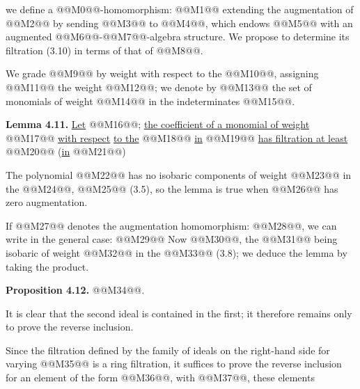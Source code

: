 we define a @@M0@@-homomorphism: @@M1@@ extending the augmentation of @@M2@@ by sending @@M3@@ to @@M4@@, which endows @@M5@@ with an augmented @@M6@@-@@M7@@-algebra structure. We propose to determine its filtration (3.10) in terms of that of @@M8@@.

We grade @@M9@@ by weight with respect to the @@M10@@, assigning @@M11@@ the weight @@M12@@; we denote by @@M13@@ the set of monomials of weight @@M14@@ in the indeterminates @@M15@@.

\textbf{Lemma 4.11.} \uline{Let} @@M16@@; \uline{the coefficient of a monomial of weight} @@M17@@ \uline{with respect} \uline{to the} @@M18@@ \uline{in} @@M19@@ \uline{has filtration at least} @@M20@@ (\uline{in} @@M21@@)

The polynomial @@M22@@ has no isobaric components of weight @@M23@@ in the @@M24@@, @@M25@@ (3.5), so the lemma is true when @@M26@@ has zero augmentation.

If @@M27@@ denotes the augmentation homomorphism: @@M28@@, we can write in the general case:
@@M29@@
Now @@M30@@, the @@M31@@ being isobaric of weight @@M32@@ in the @@M33@@ (3.8); we deduce the lemma by taking the product.

\textbf{Proposition 4.12.} @@M34@@.

It is clear that the second ideal is contained in the first; it therefore remains only to prove the reverse inclusion.

Since the filtration defined by the family of ideals on the right-hand side for varying @@M35@@ is a ring filtration, it suffices to prove the reverse inclusion for an element of the form @@M36@@, with @@M37@@, these elements

